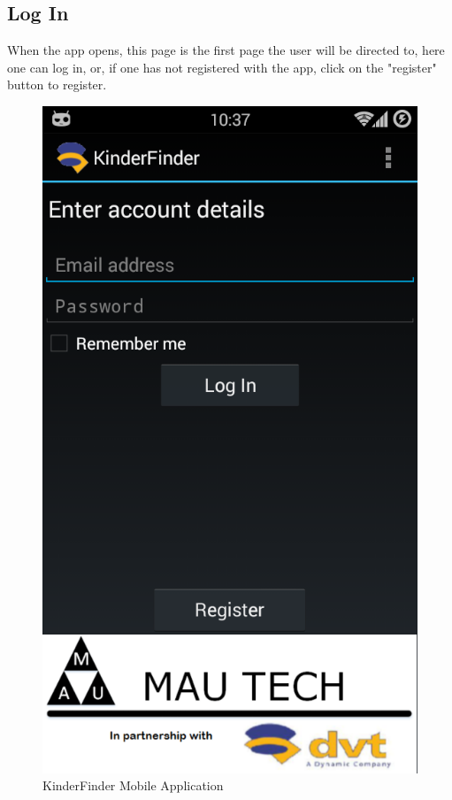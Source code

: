 \documentclass{article}
\begin{document}
\subsection{Log In}
When the app opens, this page is the first page the user will be directed to, here one can log in, or, if one has not registered with the app, click on the "register" button to register.
\begin{figure}[H]
\centering
\includegraphics[scale=0.4]{Main App - Log In.png}
\caption{KinderFinder Mobile Application}
\end{figure}
\end{document}
